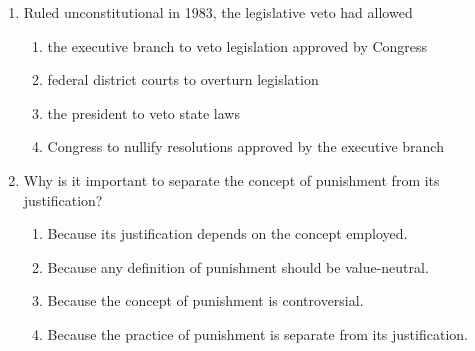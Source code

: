\documentclass[12pt]{article}
\begin{document}
\begin{enumerate}[label=\arabic*.]
\begin{enumerate}[label=(\alph*)]
    \item Joint Chiefs of Staff
    \item House Ways and Means Committee
    \item Central Intelligence Agency
    \item president
\end{enumerate}
\item Ruled unconstitutional in 1983, the legislative veto had allowed
\begin{enumerate}[label=(\alph*)]
    \item the executive branch to veto legislation approved by Congress
    \item federal district courts to overturn legislation
    \item the president to veto state laws
    \item Congress to nullify resolutions approved by the executive branch
\end{enumerate}
\item Why is it important to separate the concept of punishment from its justification?
\begin{enumerate}[label=(\alph*)]
    \item Because its justification depends on the concept employed.
    \item Because any definition of punishment should be value-neutral.
    \item Because the concept of punishment is controversial.
    \item Because the practice of punishment is separate from its justification.
\end{enumerate}
\end{enumerate}
\end{document}
